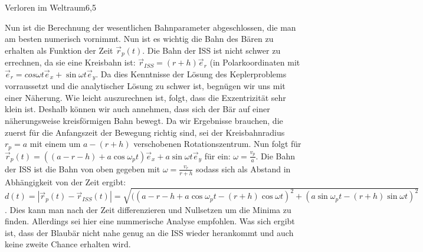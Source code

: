 \begin{problem}{Verloren im Weltraum}{6,5}
\begin{solution}
Nun ist die Berechnung der wesentlichen Bahnparameter abgeschlossen, die man am besten numerisch vornimmt. Nun ist es wichtig die Bahn des Bären zu erhalten als Funktion der Zeit $\vec{r}_p(t)$. Die Bahn der ISS ist nicht schwer zu errechnen, da sie eine Kreisbahn ist: $\vec{r}_{ISS}=(r+h)\vec{e}_{r}$ (in Polarkoordinaten mit $\vec{e}_r=cos{\omega t}\vec{e}_x+\sin{\omega t}\vec{e}_y$. Da dies Kenntnisse der Lösung des Keplerproblems vorraussetzt und die analytischer Lösung zu schwer ist, begnügen wir uns mit einer Näherung. Wie leicht auszurechnen ist, folgt, dass die Exzentrizität sehr klein ist. Deshalb können wir auch annehmen, dass sich der Bär auf einer näherungsweise kreisförmigen Bahn bewegt. Da wir Ergebnisse brauchen, die zuerst für die Anfangszeit der Bewegung richtig sind, sei der Kreisbahnradius $r_p=a$ mit einem um $a-(r+h)$ verschobenen Rotationszentrum. Nun folgt für $\vec{r}_p(t)=((a-r-h)+a\cos{\omega_p t})\vec{e}_x+a\sin{\omega t}\vec{e}_y$ für ein: $\omega=\frac{v_p}{a}$. Die Bahn der ISS ist die Bahn von oben gegeben mit $\omega=\frac{v_r}{r+h}$ sodass sich als Abstand in Abhängigkeit von der Zeit ergibt: $d(t)=|\vec{r}_p(t)-\vec{r}_{ISS}(t)|=\sqrt{((a-r-h+a\cos{\omega_p t}-(r+h)\cos{\omega t})^2+(a\sin{\omega_p t}-(r+h)\sin{\omega t})^2}$. Dies kann man nach der Zeit differenzieren und Nullsetzen um die Minima zu finden. Allerdings sei hier eine nummerische Analyse empfohlen. Was sich ergibt ist, dass der Blaubär nicht nahe genug an die ISS wieder herankommt und auch keine zweite Chance erhalten wird.
\end{solution}
\end{problem}

